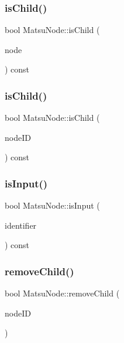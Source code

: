 \subsubsection{\texorpdfstring{is\+Child()}{isChild()}\hspace{0.1cm}{\footnotesize\ttfamily [1/2]}}
{\footnotesize\ttfamily bool Matsu\+Node\+::is\+Child (\begin{DoxyParamCaption}\item[{\mbox{\hyperlink{classMatsuNode}{Matsu\+Node}} \&}]{node }\end{DoxyParamCaption}) const}

\mbox{\label{classMatsuNode_a34f20a52ff0ac6a5119ed4a5439e03fc}} 
\subsubsection{\texorpdfstring{is\+Child()}{isChild()}\hspace{0.1cm}{\footnotesize\ttfamily [2/2]}}
{\footnotesize\ttfamily bool Matsu\+Node\+::is\+Child (\begin{DoxyParamCaption}\item[{unsigned}]{node\+ID }\end{DoxyParamCaption}) const}

\mbox{\label{classMatsuNode_ae6b9a2f6b11ec66c1e1ee352532a8544}} 
\subsubsection{\texorpdfstring{is\+Input()}{isInput()}}
{\footnotesize\ttfamily bool Matsu\+Node\+::is\+Input (\begin{DoxyParamCaption}\item[{unsigned}]{identifier }\end{DoxyParamCaption}) const}

\mbox{\label{classMatsuNode_aa6251aafed3ea1af9ee0548a5707901c}} 
\subsubsection{\texorpdfstring{remove\+Child()}{removeChild()}\hspace{0.1cm}{\footnotesize\ttfamily [1/2]}}
{\footnotesize\ttfamily bool Matsu\+Node\+::remove\+Child (\begin{DoxyParamCaption}\item[{unsigned}]{node\+ID }\end{DoxyParamCaption})}

